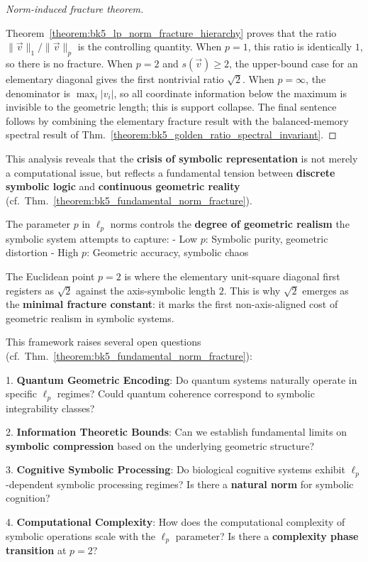 \begin{proof}[Norm-induced fracture theorem]
\label{proof:bk5_fundamental_norm_fracture}
\leavevmode

Theorem~\ref{theorem:bk5_lp_norm_fracture_hierarchy} proves that the ratio
$\|\vec{v}\|_1/\|\vec{v}\|_p$ is the controlling quantity.  When $p=1$, this
ratio is identically $1$, so there is no fracture.  When $p=2$ and
$s(\vec{v})\geq2$, the upper-bound case for an elementary diagonal gives the
first nontrivial ratio $\sqrt{2}$.  When $p=\infty$, the denominator is
$\max_i |v_i|$, so all coordinate information below the maximum is invisible to
the geometric length; this is support collapse.  The final sentence follows by
combining the elementary fracture result with the balanced-memory spectral
result of Thm.~\ref{theorem:bk5_golden_ratio_spectral_invariant}.
\end{proof}

\begin{demonstratio}
\label{demonstratio:bk5_geometry_symbol_unity}
This analysis reveals that the \textbf{crisis of symbolic representation} is not merely a computational issue, but reflects a fundamental tension between \textbf{discrete symbolic logic} and \textbf{continuous geometric reality} (cf.~Thm.~\ref{theorem:bk5_fundamental_norm_fracture}). 

The parameter $p$ in $\ell_p$ norms controls the \textbf{degree of geometric realism} the symbolic system attempts to capture:
- Low $p$: Symbolic purity, geometric distortion
- High $p$: Geometric accuracy, symbolic chaos

The Euclidean point $p = 2$ is where the elementary unit-square diagonal first
registers as $\sqrt{2}$ against the axis-symbolic length $2$.  This is why
$\sqrt{2}$ emerges as the \textbf{minimal fracture constant}: it marks the first
non-axis-aligned cost of geometric realism in symbolic systems.
\end{demonstratio}

\begin{remark}
\label{remark:bk5_open_questions}
This framework raises several open questions
(cf.~Thm.~\ref{theorem:bk5_fundamental_norm_fracture}):

1. \textbf{Quantum Geometric Encoding}: Do quantum systems naturally operate in specific $\ell_p$ regimes? Could quantum coherence correspond to symbolic integrability classes?

2. \textbf{Information Theoretic Bounds}: Can we establish fundamental limits on \textbf{symbolic compression} based on the underlying geometric structure?

3. \textbf{Cognitive Symbolic Processing}: Do biological cognitive systems exhibit $\ell_p$-dependent symbolic processing regimes? Is there a \textbf{natural norm} for symbolic cognition?

4. \textbf{Computational Complexity}: How does the computational complexity of symbolic operations scale with the $\ell_p$ parameter? Is there a \textbf{complexity phase transition} at $p = 2$?
\end{remark}

